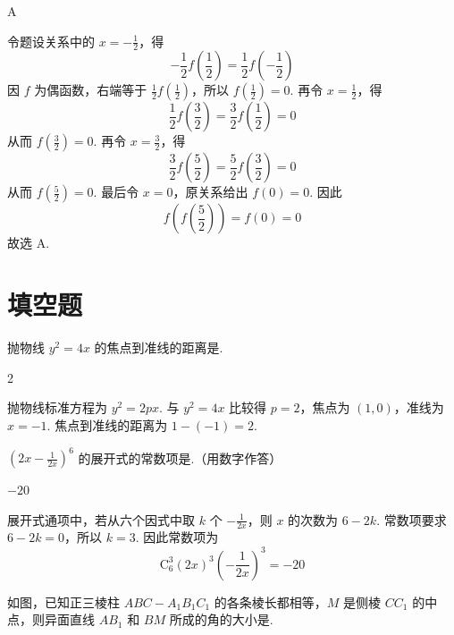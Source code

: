 \begin{answer}
A
\end{answer}

\begin{solution}
令题设关系中的 \(x=-\frac12\)，得
\[
-\frac12f\left(\frac12\right)=\frac12f\left(-\frac12\right)
\]
因 \(f\) 为偶函数，右端等于 \(\frac12f(\frac12)\)，所以
\(f(\frac12)=0\). 再令 \(x=\frac12\)，得
\[
\frac12f\left(\frac32\right)=\frac32f\left(\frac12\right)=0
\]
从而 \(f(\frac32)=0\). 再令 \(x=\frac32\)，得
\[
\frac32f\left(\frac52\right)=\frac52f\left(\frac32\right)=0
\]
从而 \(f(\frac52)=0\). 最后令 \(x=0\)，原关系给出
\(f(0)=0\). 因此
\[
f\left(f\left(\frac52\right)\right)=f(0)=0
\]
故选 A.
\end{solution}

\section{填空题}

\begin{problem}
抛物线 \(y^{2} = 4x\) 的焦点到准线的距离是\fillinblank{}.
\end{problem}

\begin{answer}
2
\end{answer}

\begin{solution}
抛物线标准方程为 \(y^2=2px\). 与 \(y^2=4x\) 比较得 \(p=2\)，焦点为
\((1,0)\)，准线为 \(x=-1\). 焦点到准线的距离为 \(1-(-1)=2\).
\end{solution}

\begin{problem}
\(\left(2x - \frac{1}{2x}\right)^6\) 的展开式的常数项是\fillinblank{}.（用数字作答）
\end{problem}

\begin{answer}
\(-20\)
\end{answer}

\begin{solution}
展开式通项中，若从六个因式中取 \(k\) 个 \(-\frac{1}{2x}\)，则 \(x\) 的次数为
\(6-2k\). 常数项要求 \(6-2k=0\)，所以 \(k=3\). 因此常数项为
\[
\mathrm C_6^3(2x)^3\left(-\frac{1}{2x}\right)^3=-20
\]
\end{solution}

\begin{problem}
如图，已知正三棱柱 \(ABC - A_{1}B_{1}C_{1}\) 的各条棱长都相等，\(M\) 是侧棱 \(CC_{1}\) 的中点，则异面直线 \(AB_{1}\) 和 \(BM\) 所成的角的大小是\fillinblank{}.

\end{problem}

